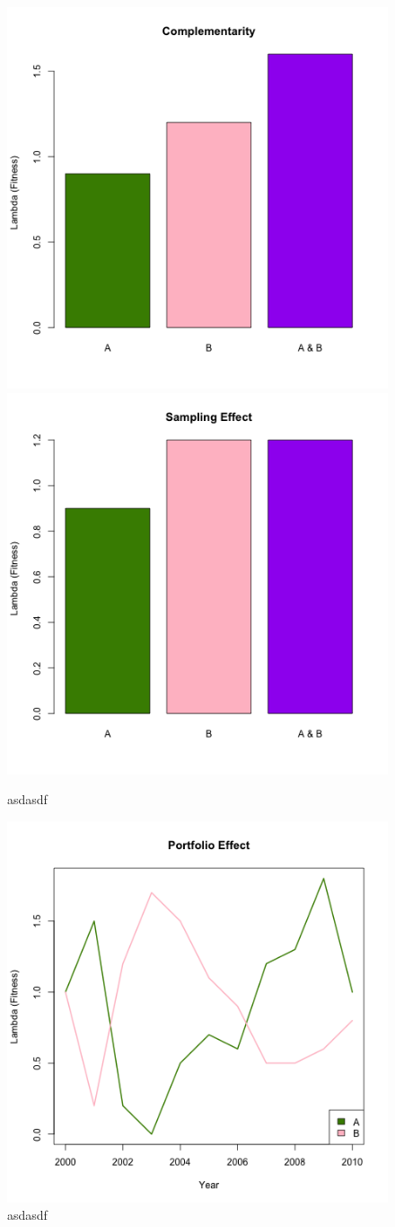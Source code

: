 \documentclass[12pt,a4paper]{article}
\begin{document}
\begin{figure}[h]
	\includegraphics[width=0.58\linewidth]{Complementarity copy.png}
	\includegraphics[width=0.40\linewidth]{Sampling_Effect copy.png}
	\caption{asdasdf}
	\label{fig:comp-samp}
\end{figure}
\begin{figure}[h]
	\includegraphics[width=0.60\linewidth]{Portfolio_Effect copy.png}
	\caption{asdasdf}
	\label{fig:portfolio}
\end{figure}
\end{document}
